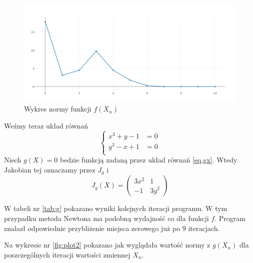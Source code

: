 \documentclass{article}
\begin{document}
    \begin{figure}
      \includegraphics[width=\linewidth]{fplot.png}
      \caption{Wykres normy funkcji $f(X_n)$}
      \label{fig:plot1}
    \end{figure}

    Weźmy teraz układ równań
    \begin{equation}\label{eq.gx}
      \begin{cases}
        x^3 + y - 1 &= 0 \\
        y^3 - x + 1 &= 0 \\
      \end{cases}
    \end{equation}
    Niech $g(X) = 0$ bedzie funkcją zadaną przez układ równań \eqref{eq.gx}.
    Wtedy Jakobian tej oznaczamy przez $J_g$ i
    \begin{equation*}
      J_{g}(X) =
      \begin{pmatrix}
        3x^2 & 1    \\
        -1   & 3y^2
      \end{pmatrix}
    \end{equation*}

    W tabeli nr \ref{tab:g} pokazano wyniki kolejnych iteracji programu. W tym przypadku
    metoda Newtona ma podobną wydajność co dla funkcji $f $. Program
    znalazł odpowiednie przybliżenie miejsca zerowego już po 9 iteracjach.

    Na wykresie nr \ref{fig:plot2} pokazano jak wyglądała wartość normy z $g(X_n)$
    dla poszczególnych iteracji wartości zmiennej $X_n$.
\end{document}
